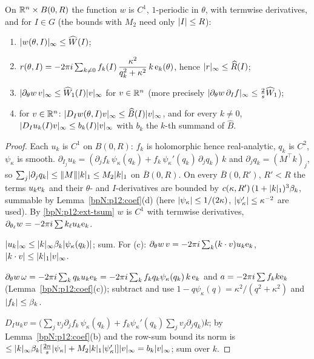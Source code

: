\begin{lemma}\label{bpN:p12:wreg}
On $\mathbb{R}^n\times B(0,R)$ the function $w$ is $C^1$, $1$-periodic in $\theta$, with termwise derivatives, and for $I\in G$ (the bounds with $M_2$ need only $\lvert I\rvert\le R$):
\begin{enumerate}[label=(\alph*)]
\item $\lvert w(\theta,I)\rvert_\infty\le\widehat W(I)$;
\item $r(\theta,I)=-2\pi i\sum_{k\ne0}f_k(I)\,\dfrac{\kappa^2}{q_k^2+\kappa^2}\,k\,\mathrm e_{k}(\theta)$, hence $\lvert r\rvert_\infty\le\widehat R(I)$;
\item $\lvert \partial_\theta w\,v\rvert_\infty\le\widehat W_1(I)\lvert v\rvert_\infty$ for $v\in\mathbb{R}^n$ (more precisely $\lvert \partial_\theta w\,\partial_If\rvert_\infty\le\frac2s\widehat W_1$);
\item for $v\in\mathbb{R}^n$: $\lvert D_Iw(\theta,I)v\rvert_\infty\le\widehat B(I)\lvert v\rvert_\infty$, and for every $k\ne0$, $\lvert D_Iu_k(I)v\rvert_\infty\le b_k(I)\lvert v\rvert_\infty$ with $b_k$ the $k$-th summand of $\widehat B$.
\end{enumerate}
\end{lemma}
\begin{proof}
\label{stepN:p12:wr-smooth} Each $u_k$ is $C^1$ on $B(0,R)$: $f_k$ is holomorphic hence real-analytic, $q_k$ is $C^2$, $\psi_\kappa$ is smooth. $\partial_{I_j}u_k=(\partial_jf_k\,\psi_\kappa(q_k)+f_k\,\psi_\kappa'(q_k)\,\partial_jq_k)\,k$ and $\partial_jq_k=(M^\top k)_j$, so $\sum_j\lvert \partial_jq_k\rvert\le\lVert M\rVert\lvert k\rvert_1\le M_2\lvert k\rvert_1$ on $\overline B(0,R)$. On every $\overline B(0,R')$, $R'<R$ the terms $u_k\mathrm e_{k}$ and their $\theta$- and $I$-derivatives are bounded by $c(\kappa,R')\,(1+\lvert k\rvert_1)^3\beta_k$, summable by Lemma~\ref{bpN:p12:coef}(d) (here $\lvert \psi_\kappa\rvert\le1/(2\kappa)$, $\lvert \psi'_\kappa\rvert\le\kappa^{-2}$ are used). By \ref{bpN:p12:ext-tsum} $w$ is $C^1$ with termwise derivatives, $\partial_{\theta_\ell}w=-2\pi i\sum k_\ell u_k\mathrm e_{k}$.

\label{stepN:p12:wr-ac} $\lvert u_k\rvert_\infty\le\lvert k\rvert_\infty\beta_k\lvert \psi_\kappa(q_k)\rvert$; sum. For (c): $\partial_\theta w\,v=-2\pi i\sum_k(k\cdot v)u_k\mathrm e_{k}$, $\lvert k\cdot v\rvert\le\lvert k\rvert_1\lvert v\rvert_\infty$.

\label{stepN:p12:wr-b} $\partial_\theta w\,\omega=-2\pi i\sum_kq_ku_k\mathrm e_{k}=-2\pi i\sum_kf_kq_k\psi_\kappa(q_k)\,k\,\mathrm e_{k}$ and $a=-2\pi i\sum f_kk\mathrm e_{k}$ (Lemma~\ref{bpN:p12:coef}(c)); subtract and use $1-q\psi_\kappa(q)=\kappa^2/(q^2+\kappa^2)$ and $\lvert f_k\rvert\le\beta_k$.

\label{stepN:p12:wr-d} $D_Iu_kv=\bigl(\sum_jv_j\partial_jf_k\,\psi_\kappa(q_k)+f_k\psi_\kappa'(q_k)\sum_jv_j\partial_jq_k\bigr)k$; by Lemma~\ref{bpN:p12:coef}(b) and the row-sum bound its norm is $\le\lvert k\rvert_\infty\beta_k[\frac{2n}s\lvert \psi_\kappa\rvert+M_2\lvert k\rvert_1\lvert \psi_\kappa'\rvert]\lvert v\rvert_\infty=b_k\lvert v\rvert_\infty$; sum over $k$.
\end{proof}

